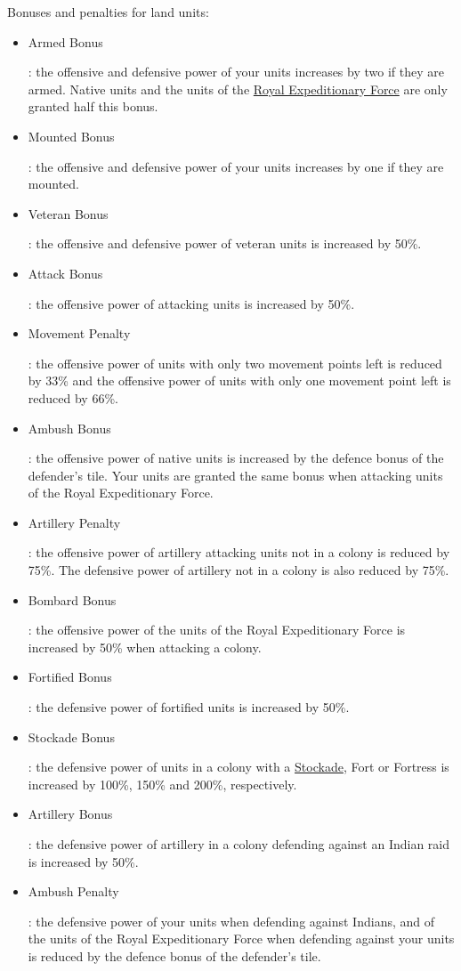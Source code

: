 \documentclass[12pt]{book}
\begin{document}
Bonuses and penalties for land units:

\begin{itemize}
\item \hypertarget{Armed Bonus}{Armed Bonus}: the offensive and
  defensive power of your units increases by two if they are
  armed. Native units and the units of the \hyperlink{Royal
    Expeditionary Force}{Royal Expeditionary Force} are only granted
  half this bonus.
\item \hypertarget{Mounted Bonus}{Mounted Bonus}: the offensive and
  defensive power of your units increases by one if they are mounted.
\item \hypertarget{Veteran Bonus}{Veteran Bonus}: the offensive and
  defensive power of veteran units is increased by 50\%.
\item \hypertarget{Attack Bonus}{Attack Bonus}: the offensive power of
  attacking units is increased by 50\%.
\item \hypertarget{Movement Penalty}{Movement Penalty}: the offensive
  power of units with only two movement points left is reduced by 33\%
  and the offensive power of units with only one movement point left
  is reduced by 66\%.
\item \hypertarget{Ambush Bonus}{Ambush Bonus}: the offensive power of
  native units is increased by the defence bonus of the defender's
  tile. Your units are granted the same bonus when attacking units of
  the Royal Expeditionary Force.
\item \hypertarget{Artillery Penalty}{Artillery Penalty}: the
  offensive power of artillery attacking units not in a colony is
  reduced by 75\%. The defensive power of artillery not in a colony is
  also reduced by 75\%.
\item \hypertarget{Bombard Bonus}{Bombard Bonus}: the offensive power
  of the units of the Royal Expeditionary Force is increased by 50\%
  when attacking a colony.
\item \hypertarget{Fortified Bonus}{Fortified Bonus}: the defensive
  power of fortified units is increased by 50\%.
\item \hypertarget{Stockade Bonus}{Stockade Bonus}: the defensive
  power of units in a colony with a \hyperlink{Stockade}{Stockade},
  Fort or Fortress is increased by 100\%, 150\% and 200\%,
  respectively.
\item \hypertarget{Artillery Bonus}{Artillery Bonus}: the defensive
  power of artillery in a colony defending against an Indian raid is
  increased by 50\%.
\item \hypertarget{Ambush Penalty}{Ambush Penalty}: the defensive
  power of your units when defending against Indians, and of the units
  of the Royal Expeditionary Force when defending against your units
  is reduced by the defence bonus of the defender's tile.
\end{itemize}
\end{document}
